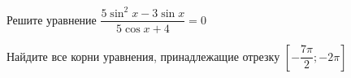 \begin{ex}
	\begin{condition}
		\begin{enumcols}[label=\asbuk*)]
			\item Решите уравнение \( \dfrac{5\sin^2  x- 3\sin x}{5 \cos x +4} =0 \)
			\item Найдите все корни уравнения, принадлежащие отрезку \( \left[-\dfrac{7\pi}{2};-2\pi\right] \)
		\end{enumcols}
	\end{condition}
\end{ex}